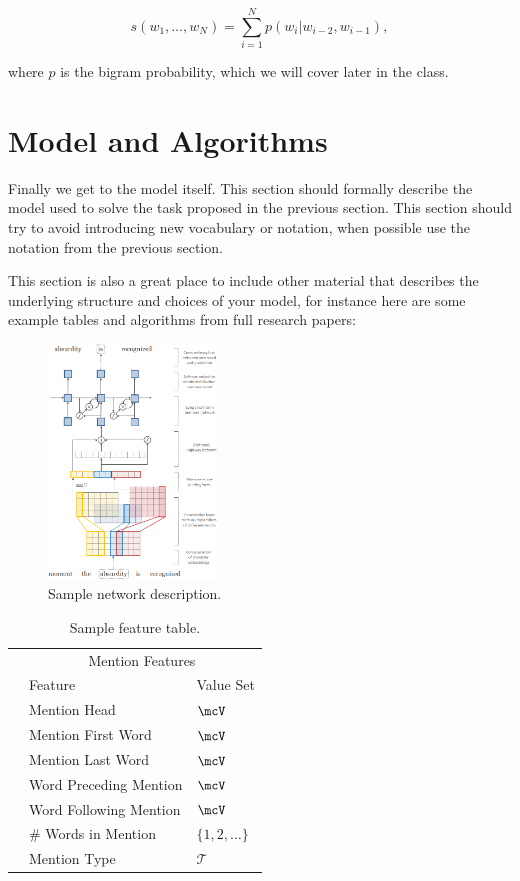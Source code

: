 \documentclass[11pt]{article}
\begin{document}
\[ s(w_1, \ldots, w_N) = \sum_{i = 1}^N p(w_i | w_{i-2}, w_{i-1}), \]

\noindent where $p$ is the bigram probability, which we will cover later in the class.

\section{Model and Algorithms}

Finally we get to the model itself. This section should formally describe
the model used to solve the task proposed in the previous section. This section should try to avoid introducing new vocabulary or notation, when possible use the notation from the previous section. 

This section is also a great place to include other material that describes the underlying structure and choices of your model, for instance here are some example tables and algorithms from full research papers: 


\begin{figure}[t!]
  \centering
  \includegraphics[width=0.4\textwidth]{network}
  \caption{\label{fig:network} Sample network description.}
\end{figure}

\begin{table}[t!]
\small
\centering
\begin{tabular}{@{}lll@{}}

\toprule
&\multicolumn{2}{c}{Mention Features  } \\
 & Feature & Value Set\\
\midrule
& Mention Head & $\mcV$ \\
& Mention First Word & $\mcV$ \\
& Mention Last Word & $\mcV$ \\
& Word Preceding Mention & $\mcV$ \\
& Word Following Mention & $\mcV$\\
& \# Words in Mention & $\{1, 2, \ldots \}$ \\
& Mention Type & $\mathcal{T}$ \\
\bottomrule
\end{tabular}
\caption{\label{fig:features} Sample feature table.}
\end{table}
\end{document}
